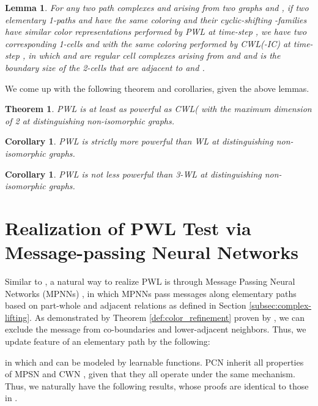 \documentclass[letterpaper]{article} \usepackage{aaai24}  \usepackage{times}  \usepackage{helvet}  \usepackage{courier}  \usepackage[hyphens]{url}  \usepackage{graphicx} \urlstyle{rm} \def\UrlFont{\rm}  \usepackage{natbib}  \usepackage{caption} \frenchspacing  \setlength{\pdfpagewidth}{8.5in} \setlength{\pdfpageheight}{11in} \usepackage{algorithm}
\newtheorem{corollary}[definition]{Corollary}
\newtheorem{lemma}[definition]{Lemma}
\newtheorem{theorem}[definition]{Theorem}
\begin{document}
\begin{lemma} \label{lemma:p-paths to 1-cells}
    For any two path complexes  and  arising from two graphs  and , if two elementary 1-paths  and  have the same coloring  and their cyclic-shifting -families have similar color representations  performed by PWL at time-step , we have two corresponding 1-cells  and  with the same coloring  performed by CWL(-IC) at time-step , in which  and  are regular cell complexes arising from  and  and  is the boundary size of the 2-cells that are adjacent to  and .
\end{lemma}

We come up with the following theorem and corollaries, given the above lemmas.

\begin{theorem} \label{theorem:pwl_cwl}
    PWL is at least as powerful as CWL( with the maximum dimension of 2 at distinguishing non-isomorphic graphs.
\end{theorem}

\begin{corollary}
    \label{corollary:pwl_wl}
    PWL is strictly more powerful than WL at distinguishing non-isomorphic graphs.
\end{corollary}

\begin{corollary}
    \label{corollary:pwl_3wl}
    PWL is not less powerful than 3-WL at distinguishing non-isomorphic graphs.
\end{corollary}

\section{Realization of PWL Test via Message-passing Neural Networks} \label{section:pcn}

Similar to \cite{bodnar_weisfeiler_2021, bodnar_weisfeiler_2022}, a natural way to realize PWL is through Message Passing Neural Networks (MPNNs) \cite{gilmer_neural_2017}, in which MPNNs pass messages along elementary paths based on part-whole and adjacent relations as defined in Section \ref{subsec:complex-lifting}. As demonstrated by Theorem \ref{def:color_refinement} proven by \citeauthor{bodnar_weisfeiler_2022}, we can exclude the message from co-boundaries and lower-adjacent neighbors. Thus, we update feature of an elementary path by the following:

in which  and  can be modeled by learnable functions. PCN inherit all properties of MPSN \cite{bodnar_weisfeiler_2021} and CWN \cite{bodnar_weisfeiler_2022}, given that they all operate under the same mechanism. Thus, we naturally have the following results, whose proofs are identical to those in \cite{bodnar_weisfeiler_2022}.
\end{document}
